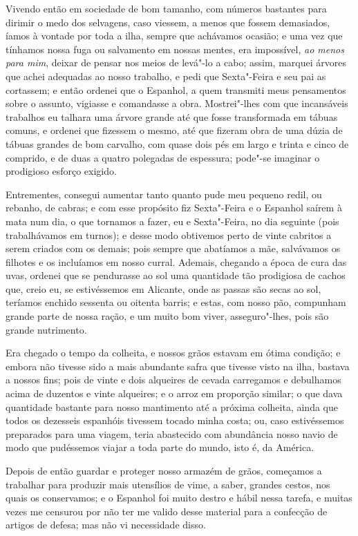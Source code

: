 Vivendo então em sociedade de bom tamanho, com números bastantes para
dirimir o medo dos selvagens, caso viessem, a menos que fossem
demasiados, íamos à vontade por toda a ilha, sempre que achávamos
ocasião; e uma vez que tínhamos nossa fuga ou salvamento em nossas
mentes, era impossível, \emph{ao menos para mim}, deixar de pensar nos
meios de levá"-lo a cabo; assim, marquei árvores que achei adequadas ao
nosso trabalho, e pedi que Sexta"-Feira e seu pai as cortassem; e então
ordenei que o Espanhol, a quem transmiti meus pensamentos sobre o
assunto, vigiasse e comandasse a obra. Mostrei"-lhes com que incansáveis
trabalhos eu talhara uma árvore grande até que fosse transformada em
tábuas comuns, e ordenei que fizessem o mesmo, até que fizeram obra de
uma dúzia de tábuas grandes de bom carvalho, com quase dois pés em largo
e trinta e cinco de comprido, e de duas a quatro polegadas de espessura;
pode"-se imaginar o prodigioso esforço exigido.

Entrementes, consegui aumentar tanto quanto pude meu pequeno redil, ou
rebanho, de cabras; e com esse propósito fiz Sexta"-Feira e o Espanhol
saírem à mata num dia, o que tornamos a fazer, eu e Sexta"-Feira, no dia
seguinte (pois trabalhávamos em turnos); e desse modo obtivemos perto de
vinte cabritos a serem criados com os demais; pois sempre que abatíamos
a mãe, salvávamos os filhotes e os incluíamos em nosso curral. Ademais,
chegando a época de cura das uvas, ordenei que se pendurasse ao sol uma
quantidade tão prodigiosa de cachos que, creio eu, se estivéssemos em
Alicante, onde as passas são secas ao sol, teríamos enchido sessenta ou
oitenta barris; e estas, com nosso pão, compunham grande parte de nossa
ração, e um muito bom viver, asseguro"-lhes, pois são grande nutrimento.

Era chegado o tempo da colheita, e nossos grãos estavam em ótima
condição; e embora não tivesse sido a mais abundante safra que tivesse
visto na ilha, bastava a nossos fins; pois de vinte e dois alqueires de
cevada carregamos e debulhamos acima de duzentos e vinte alqueires; e o
arroz em proporção similar; o que dava quantidade bastante para nosso
mantimento até a próxima colheita, ainda que todos os dezesseis
espanhóis tivessem tocado minha costa; ou, caso estivéssemos preparados
para uma viagem, teria abastecido com abundância nosso navio de modo que
pudéssemos viajar a toda parte do mundo, isto é, da América.

Depois de então guardar e proteger nosso armazém de grãos, começamos a
trabalhar para produzir mais utensílios de vime, a saber, grandes
cestos, nos quais os conservamos; e o Espanhol foi muito destro e hábil
nessa tarefa, e muitas vezes me censurou por não ter me valido desse
material para a confecção de artigos de defesa; mas não vi necessidade
disso.

